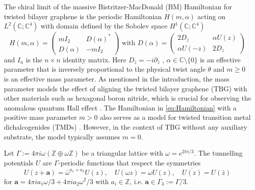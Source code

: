 \documentclass[reqno,12pt,letterpaper]{amsart}
\newcommand{\CC}{{\mathbb C}}
\newcommand{\ZZ}{{\mathbb Z}}
\numberwithin{equation}{section}
\begin{document}
The chiral limit of the massive Bistritzer-MacDonald (BM) Hamiltonian for twisted bilayer graphene is the periodic Hamiltonian $H(m,\alpha)$ acting on $L^2(\CC;\CC^4)$ with domain defined by the Sobolev space $H^1(\CC;\CC^4)$
\begin{equation}
\label{eq:Hamiltonian}
 H(m,\alpha) = \begin{pmatrix} m I_2 & D(\alpha)^* \\ D(\alpha) & -m  I_2\end{pmatrix} \text{ with } D(\alpha) = \begin{pmatrix} 2 D_{\bar z} & \alpha U(z) \\ \alpha U(-z) & 2D_{\bar z} \end{pmatrix}
 \end{equation}
 and $I_n$ is the $n \times n$ identity matrix. 
Here  $D_{\bar z} = -i \partial_{\bar z}$ , $\alpha \in \mathbb C\setminus\{0\}$ is an effective parameter that is inversely proportional to the physical twist angle $\theta$ and $m \ge 0$ is an effective mass parameter. As mentioned in the introduction, the mass parameter models the effect of aligning the twisted bilayer graphene (TBG) with other materials such as hexagonal boron nitride, which is crucial for observing the anomalous quantum Hall effect \cite{Li21}.
The Hamiltonian in \eqref{eq:Hamiltonian} with a positive mass parameter $m >0$ also serves as a model for twisted transition metal dichalcogenides (TMDs) \cite{CRQ23}. However, in the context of TBG without any auxiliary substrate, the model typically assumes $m=0$.


Let $\Gamma:=4\pi i \omega (\ZZ \oplus \omega \ZZ)$ be a triangular lattice with $\omega = e^{2\pi i /3}$. The tunnelling potentials $U$ are $\Gamma$-periodic functions that respect the symmetries
\begin{equation}
\label{eq:symmetries}
U(z+\mathbf a)=\bar\omega^{a_1+a_2}U(z), \quad U(\omega z) = \omega U(z), \quad \overline{U(z)}=U(\bar z)
\end{equation} 
for $\mathbf a = 4\pi i a_1 \omega/3+ 4\pi i a_2 \omega^2/3$ with $a_i \in \ZZ$, i.e. $\mathbf a \in \Gamma_3 :=\Gamma/3.$
\end{document}
